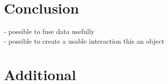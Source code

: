 \documentclass[11pt,a4paper,oldfontcommands, oneside]{memoir}
\begin{document}
\chapter{Conclusion}
- possible to fuse data usefully\\
- possible to create a usable interaction this an object\\



\chapter{Additional}
\nocite{*} %
\end{document}
